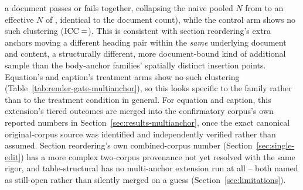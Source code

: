 \documentclass[11pt]{article}
\DeclareRobustCommand{\claim}[2]{#2}
\begin{document}
\begin{sloppypar}
{{a document passes or fails together, collapsing the naive pooled $N$ from  to an effective $N$ of
, identical to the document count}), while the control arm shows no such clustering ($\text{ICC}=\val{maext.secreorder.control.icc}$).}
\claim{section-reorder-icc-open-finding}{This is consistent with section reordering's extra anchors moving a different heading pair within
the \emph{same} underlying document and content, a structurally different, more document-bound
kind of additional sample than the body-anchor families' spatially distinct insertion points.
Equation's and caption's treatment arms show no such clustering
(Table~\ref{tab:render-gate-multianchor}), so this looks specific to the family rather than to the
treatment condition in general.} \claim{multianchor-equation-caption-merged}{For equation and caption, this extension's tiered outcomes are merged into
the confirmatory corpus's own reported numbers in Section~\ref{sec:results-multianchor}, once the
exact canonical original-corpus source was identified and independently verified rather than
assumed.} \claim{multianchor-sr-table-not-merged}{Section reordering's own combined-corpus number (Section~\ref{sec:single-edit}) has a
more complex two-corpus provenance not yet resolved with the same rigor, and table-structural has
no multi-anchor extension run at all -- both named as still-open rather than silently merged on a
guess (Section~\ref{sec:limitations}).}
\end{sloppypar}
\end{document}
